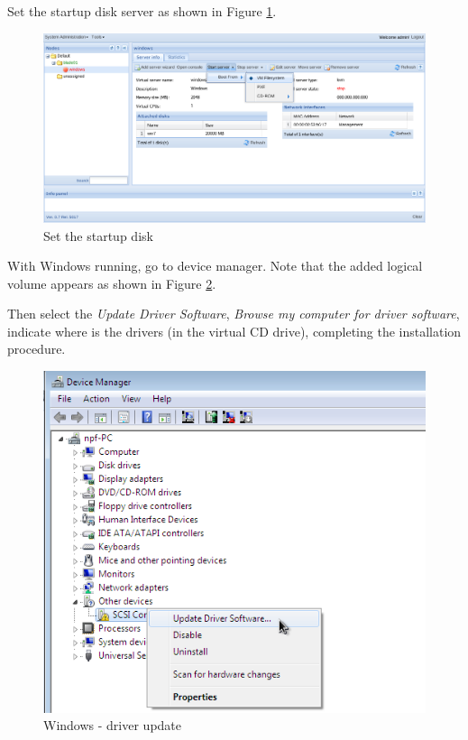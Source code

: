 Set the startup disk server as shown in Figure \ref{fig:virtio5}.

\begin{figure}[H]
	\begin{center}
	\includegraphics[scale=0.5]{screenshots/virtio/virtio_5.png}
	\caption{Set the startup disk}
	\label{fig:virtio5}
	\end{center}
\end{figure}

With Windows running, go to device manager. Note that the added logical volume appears as shown in Figure \ref{fig:virtio10}.

Then select the \textit{Update Driver Software}, \textit{Browse my computer for driver software}, indicate where is the drivers (in the virtual CD drive), completing the installation procedure.

\begin{figure}[H]
	\begin{center}
	\includegraphics[scale=0.5]{screenshots/virtio/virtio_10.png}
	\caption{Windows - driver update}
	\label{fig:virtio10}
	\end{center}
\end{figure}

